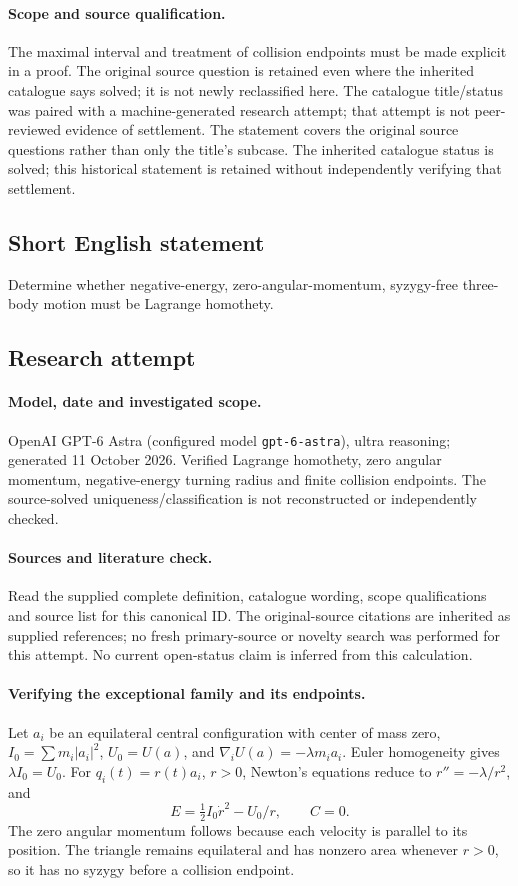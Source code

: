 \documentclass[11pt]{article}
\begin{document}
\paragraph{Scope and source qualification.}The maximal interval and treatment of collision endpoints must be made explicit in a proof. The original source question is retained even where the inherited catalogue says solved; it is not newly reclassified here. The catalogue title/status was paired with a machine-generated research attempt; that attempt is not peer-reviewed evidence of settlement. The statement covers the original source questions rather than only the title’s subcase. The inherited catalogue status is solved; this historical statement is retained without independently verifying that settlement.
\subsection{Short English statement}
Determine whether negative-energy, zero-angular-momentum, syzygy-free three-body motion must be Lagrange homothety.
\subsection{Research attempt}
\paragraph{Model, date and investigated scope.}
OpenAI GPT-6 Astra (configured model \texttt{gpt-6-astra}), ultra reasoning; generated 11 October 2026. Verified Lagrange homothety, zero angular momentum, negative-energy turning radius and finite collision endpoints. The source-solved uniqueness/classification is not reconstructed or independently checked.

\paragraph{Sources and literature check.}
Read the supplied complete definition, catalogue wording, scope qualifications and source list for this canonical ID. The original-source citations are inherited as supplied references; no fresh primary-source or novelty search was performed for this attempt. No current open-status claim is inferred from this calculation.

\paragraph{Verifying the exceptional family and its endpoints.}Let \(a_i\) be an equilateral central configuration with center of mass zero, \(I_0=\sum m_i|a_i|^2\), \(U_0=U(a)\), and \(\nabla_iU(a)=-\lambda m_i a_i\). Euler homogeneity gives \(\lambda I_0=U_0\). For \(q_i(t)=r(t)a_i\), \(r>0\), Newton's equations reduce to \(r''=-\lambda/r^2\), and
\[E=\tfrac12I_0\dot r^2-U_0/r,\qquad C=0.
\]
The zero angular momentum follows because each velocity is parallel to its position. The triangle remains equilateral and has nonzero area whenever \(r>0\), so it has no syzygy before a collision endpoint.
\end{document}
